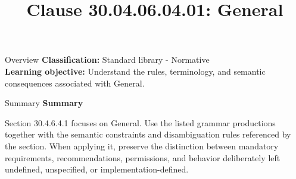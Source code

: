 \documentclass[10pt,letterpaper]{article}
\title{Clause 30.04.06.04.01: General}
\author{}
\date{}
\begin{document}
\maketitle
\begin{CornellOverviewBox}{Overview}
\textbf{Classification:} Standard library - Normative\\[2pt]
\textbf{Learning objective:} Understand the rules, terminology, and semantic consequences associated with General.
\end{CornellOverviewBox}\begin{CornellSummaryBox}{Summary}
{\sffamily\bfseries\color{Accent} Summary}\par\vspace{3pt}Section 30.4.6.4.1 focuses on General. Use the listed grammar productions together with the semantic constraints and disambiguation rules referenced by the section. When applying it, preserve the distinction between mandatory requirements, recommendations, permissions, and behavior deliberately left undefined, unspecified, or implementation-defined.
\end{CornellSummaryBox}
\end{document}
